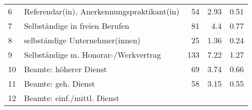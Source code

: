 \begin{longtable}{lXrrr}
     6 &
     \multicolumn{1}{X}{ Referendar(in), Anerkennungspraktikant(in)   } &


       \num{54} &
       \num[round-mode=places,round-precision=2]{2,93} &
         \num[round-mode=places,round-precision=2]{0,51} \\

     7 &
     \multicolumn{1}{X}{ Selbständige in freien Berufen   } &


       \num{81} &
       \num[round-mode=places,round-precision=2]{4,4} &
         \num[round-mode=places,round-precision=2]{0,77} \\

     8 &
     \multicolumn{1}{X}{ selbständige Unternehmer(innen)   } &


       \num{25} &
       \num[round-mode=places,round-precision=2]{1,36} &
         \num[round-mode=places,round-precision=2]{0,24} \\

     9 &
     \multicolumn{1}{X}{ Selbständige m. Honorar-/Werkvertrag   } &


       \num{133} &
       \num[round-mode=places,round-precision=2]{7,22} &
         \num[round-mode=places,round-precision=2]{1,27} \\

     10 &
     \multicolumn{1}{X}{ Beamte: höherer Dienst   } &


       \num{69} &
       \num[round-mode=places,round-precision=2]{3,74} &
         \num[round-mode=places,round-precision=2]{0,66} \\

     11 &
     \multicolumn{1}{X}{ Beamte: geh. Dienst   } &


       \num{58} &
       \num[round-mode=places,round-precision=2]{3,15} &
         \num[round-mode=places,round-precision=2]{0,55} \\

     12 &
     \multicolumn{1}{X}{ Beamte: einf./mittl. Dienst   } &



\end{longtable}
